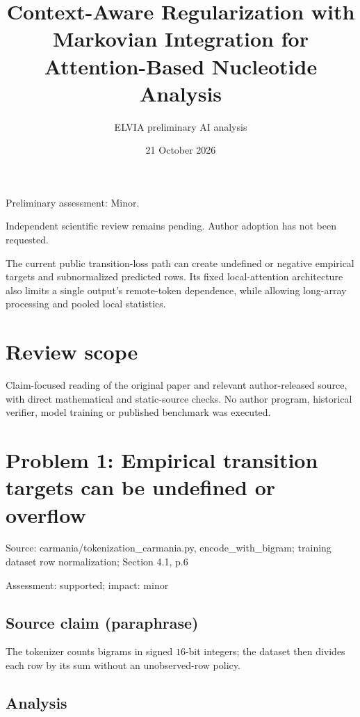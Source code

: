 \documentclass[11pt]{article}
\begin{document}
\title{Context-Aware Regularization with Markovian Integration for Attention-Based Nucleotide Analysis}

\author{ELVIA preliminary AI analysis}\date{21 October 2026}\maketitle

Preliminary assessment: Minor.\par

Independent scientific review remains pending. Author adoption has not been requested.

The current public transition-loss path can create undefined or negative empirical targets and subnormalized predicted rows. Its fixed local-attention architecture also limits a single output’s remote-token dependence, while allowing long-array processing and pooled local statistics.

\section*{Review scope}

Claim-focused reading of the original paper and relevant author-released source, with direct mathematical and static-source checks. No author program, historical verifier, model training or published benchmark was executed.

\section*{Problem 1: Empirical transition targets can be undefined or overflow}

Source: carmania/tokenization\_carmania.py, encode\_with\_bigram; training dataset row normalization; Section 4.1, p.6

Assessment: supported; impact: minor

\subsection*{Source claim (paraphrase)}

The tokenizer counts bigrams in signed \(16\)-bit integers; the dataset then divides each row by its sum without an unobserved-row policy.

\subsection*{Analysis}
\end{document}
